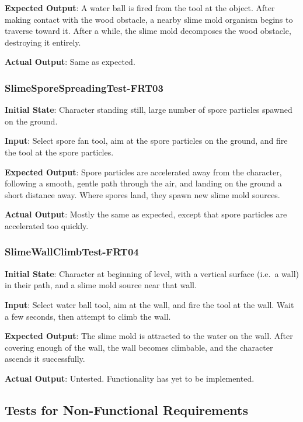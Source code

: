 \documentclass[12pt, titlepage]{article}
\begin{document}
\textbf{Expected Output}: A water ball is fired from the tool at the object.
After making contact with the wood obstacle, a nearby slime mold organism
begins to traverse toward it. After a while, the slime mold decomposes the
wood obstacle, destroying it entirely.

\textbf{Actual Output}: Same as expected.



\subsubsection{SlimeSporeSpreadingTest-FRT03}

\textbf{Initial State}: Character standing still, large number of spore
particles spawned on the ground.

\textbf{Input}: Select spore fan tool, aim at the spore particles on the
ground, and fire the tool at the spore particles.

\textbf{Expected Output}: Spore particles are accelerated away from the character,
following a smooth, gentle path through the air, and landing on the ground
a short distance away. Where spores land, they spawn new slime mold sources.

\textbf{Actual Output}: Mostly the same as expected, except that spore particles
are accelerated too quickly.



\subsubsection{SlimeWallClimbTest-FRT04}

\textbf{Initial State}: Character at beginning of level, with a vertical
surface (i.e.\ a wall) in their path, and a slime mold source near that wall.

\textbf{Input}: Select water ball tool, aim at the wall, and fire
the tool at the wall. Wait a few seconds, then attempt to climb the wall.

\textbf{Expected Output}: The slime mold is attracted to the water on the wall. After covering
enough of the wall, the wall becomes climbable, and the character ascends it successfully.

\textbf{Actual Output}: Untested. Functionality has yet to be implemented.



\subsection{Tests for Non-Functional Requirements}
\end{document}
